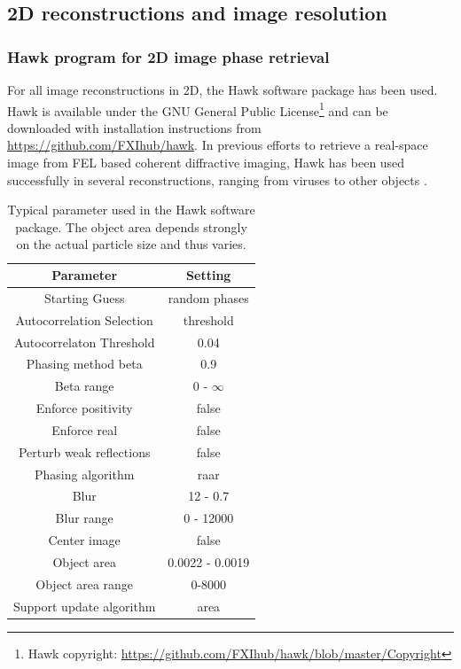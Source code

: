 \subsection{2D reconstructions and image resolution}
%
%
%
\subsubsection{Hawk program for 2D image phase retrieval}
For all image reconstructions in 2D, the Hawk software package \citep{Maia-2010-JAC} has been used. Hawk is available under the GNU General Public License\footnote{Hawk copyright: \url{https://github.com/FXIhub/hawk/blob/master/Copyright}} and can be downloaded with installation instructions from \url{https://github.com/FXIhub/hawk}. In previous efforts to retrieve a real-space image from FEL based coherent diffractive imaging, Hawk has been used successfully in several reconstructions, ranging from viruses \citep{Seibert-2011-Nature,Ekeberg-2015-PRL} to other objects \citep{Seibert-2010-JPhysB}.
\begin{table}%
\centering
\begin{tabular}{ |c|c|}
 \hline
 \textbf{Parameter} & \textbf{Setting} \\ 
 \hline
 Starting Guess & random phases \\ \hline
 Autocorrelation Selection & threshold \\ \hline
 Autocorrelaton Threshold & 0.04  \\ \hline
 Phasing method beta & 0.9  \\ \hline
 Beta range & 0 - $\infty$ \\ \hline
 Enforce positivity & false   \\ \hline
 Enforce real & false     \\\hline
Perturb weak reflections & false \\ \hline
Phasing algorithm & raar \\ \hline
Blur & 12 - 0.7 \\ \hline
Blur range & 0 - 12000 \\ \hline
Center image & false \\ \hline
Object area & 0.0022 - 0.0019 \\ \hline
Object area range & 0-8000\\ \hline
Support update algorithm & area \\ \hline
\end{tabular}
\caption[Typical parameter used in the Hawk software package.]{Typical parameter used in the Hawk software package. The object area depends strongly on the actual particle size and thus varies.}
\label{tab:hawk-parameter}
\end{table}
